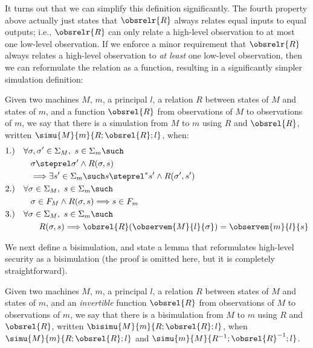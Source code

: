 It turns out that we can simplify this definition significantly. The fourth
property above actually just states that $\obsrelr{R}$ always relates equal
inputs to equal outputs; i.e., $\obsrelr{R}$ can only relate a high-level
observation to at most one low-level observation. If we enforce a minor 
requirement that $\obsrelr{R}$ always relates a high-level observation to
\emph{at least} one low-level observation, then we can reformulate the relation
as a function, resulting in a significantly simpler simulation definition:

\begin{definition}
\label{gensimdef}
Given two machines $M$, $m$, a principal $l$, a relation $R$ between
states of $M$ and states of $m$, and a function $\obsrel{R}$ from
observations of $M$ to observations of $m$, we say that there is a
simulation from $M$ to $m$ using $R$ and $\obsrel{R}$,
written $\simu{M}{m}{R;\obsrel{R};l}$, when:
{\small
\begin{align*}
& 1.) \quad \forall \sigma, \sigma' \in \Sigma_M, \,\, s \in \Sigma_m \such \\
& \qquad \quad \sigma \steprel \sigma' \land R(\sigma,s) \\
& \qquad \quad \Longrightarrow 
\exists s' \in \Sigma_m \such s \steprel^* s' \land R(\sigma',s') \\
& 2.) \quad \forall \sigma \in \Sigma_M, \,\, s \in \Sigma_m \such \\
& \qquad \quad \sigma \in F_M \land R(\sigma,s) \Longrightarrow s \in F_m \\
& 3.) \quad \forall \sigma \in \Sigma_M, \,\, s \in \Sigma_m \such \\
& \qquad \qquad R(\sigma,s) \Longrightarrow 
\obsrel{R}(\observem{M}{l}{\sigma}) = \observem{m}{l}{s}
\end{align*}}
\end{definition}

We next define a bisimulation, and state a lemma that reformulates 
high-level security as a bisimulation (the proof is omitted here, but
it is completely straightforward).

\begin{definition}[Bisimulation]
\label{bisimdef}
Given two machines $M$, $m$, a principal $l$, a relation $R$ between
states of $M$ and states of $m$, and an \emph{invertible} function 
$\obsrel{R}$ from observations of $M$ to observations of $m$, 
we say that there is a bisimulation from $M$ to $m$ using $R$ and 
$\obsrel{R}$, written $\bisimu{M}{m}{R;\obsrel{R};l}$, when
$\simu{M}{m}{R;\obsrel{R};l}$ and $\simu{m}{M}{R^{-1};\obsrel{R}^{-1};l}$.
\end{definition}

